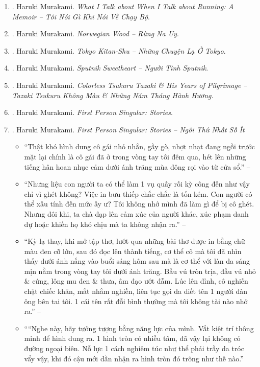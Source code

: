 \documentclass{article}
\begin{document}
\begin{enumerate}
	\item \cite{Murakami_run_VN}. Haruki Murakami. {\it What I Talk about When I Talk about Running: A Memoir -- Tôi Nói Gì Khi Nói Về Chạy Bộ}.\hfill{\sf[done]}
	
	\item \cite{Murakami_Norwegian_wood}. Haruki Murakami. {\it Norwegian Wood -- Rừng Na Uy}.\hfill{\sf[done]}
	
	\item \cite{Murakami_Tokyo}. Haruki Murakami. {\it Tokyo Kitan-Shu -- Những Chuyện Lạ Ở Tokyo}.\hfill{\sf[done]}
	
	\item \cite{Murakami_Sputnik}. Haruki Murakami. {\it Sputnik Sweetheart -- Người Tình Sputnik}.\hfill{\sf[done]}
	
	\item \cite{Murakami_Tsukuru_Tazaki_VN}. Haruki Murakami. {\it Colorless Tsukuru Tazaki \& His Years of Pilgrimage -- Tazaki Tsukuru Không Màu \& Những Năm Tháng Hành Hương}.\hfill{\sf[done]}
	
	\item \cite{Murakami_1st_person}. {\sc Haruki Murakami}. {\it First Person Singular: Stories}.
	
	\item \cite{Murakami_ngoi_1}. {\sc Haruki Murakami}. {\it First Person Singular: Stories -- Ngôi Thứ Nhất Số Ít}\hfill{\sf[done]}
	\begin{itemize}
		\item ``Thật khó hình dung cô gái nhỏ nhắn, gầy gò, nhợt nhạt đang ngồi trước mặt lại chính là cô gái đã ở trong vòng tay tôi đêm qua, hét lên những tiếng hân hoan nhục cảm dưới ánh trăng mùa đông rọi vào từ cửa sổ.'' -- \cite[Trên Gối Đá, p. 14]{Murakami_ngoi_1}
		\item ``Nhưng liệu con người ta có thể làm 1 vụ quấy rối kỳ công đến như vậy chỉ vì ghét không? Việc in bưu thiếp chắc chắc là tốn kém. Con người có thể xấu tính đến mức ấy ư? Tôi không nhớ mình đã làm gì để bị cô ghét. Nhưng đôi khi, ta chà đạp lên cảm xúc của người khác, xúc phạm danh dự hoặc khiến họ khó chịu mà ta không nhận ra.'' -- \cite[Kem, pp. 34--35]{Murakami_ngoi_1}
		\item ``Kỳ lạ thay, khi mở tập thơ, lướt qua những bài thơ được in bằng chữ màu đen cỡ lớn, sau đó đọc lên thành tiếng, cơ thể cô mà tôi đã nhìn thấy dưới ánh nắng vào buổi sáng hôm sau mà là cơ thể với làn da sáng mịn nằm trong vòng tay tôi dưới ánh trăng. Bầu vú tròn trịa, đầu vú nhỏ \& cứng, lông mu đen \& thưa, âm đạo ướt đẫm. Lúc lên đỉnh, cô nghiến chặt chiếc khăn, mắt nhắm nghiền, liên tục gọi da diết tên 1 người đàn ông bên tai tôi. 1 cái tên rất đỗi bình thường mà tôi không tài nào nhớ ra.'' -- \cite[Trên Gối Đá, p. 19]{Murakami_ngoi_1}
		\item ````Nghe này, hãy tưởng tượng bằng năng lực của mình. Vắt kiệt trí thông minh để hình dung ra. 1 hình tròn có nhiều tâm, đã vậy lại không có đường ngoại biên. Nỗ lực 1 cách nghiêm túc như thể phải trầy da tróc vẩy vậy, khi đó cậu mới dần nhận ra hình tròn đó trông như thế nào.''
		

\end{itemize}
\end{enumerate}
\end{document}
